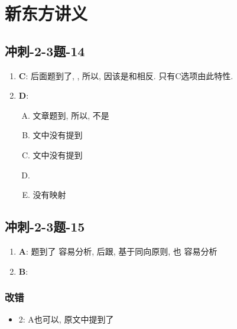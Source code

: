 \chapter{新东方讲义}

\section{冲刺-2-3题-14}

  \begin{enumerate}
    \item \textbf{C}: 后面题到了, , 所以,
    因该是和相反. 只有C选项由此特性.

    \item \textbf{D}:
    \begin{enumerate}[A.]
      \item 文章题到, 所以, 不是
      \item 文中没有提到
      \item 文中没有提到
      \item %
      \item {}没有映射
    \end{enumerate}
  \end{enumerate}

\section{冲刺-2-3题-15}

  \begin{enumerate}
    \item \textbf{A}: 题到了
    容易分析, 后跟, 基于同向原则, 也
    容易分析
    \item \textbf{B}: 
  \end{enumerate}

  \subsection{改错}

    \begin{itemize}
      \item 2: A也可以, 原文中提到了
    \end{itemize}

